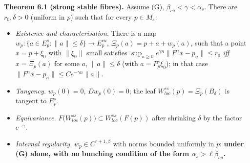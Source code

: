 \documentclass[11pt,a4paper]{article}
\theoremstyle{plain}
\theoremstyle{definition}
\theoremstyle{remark}
\numberwithin{equation}{section}
\numberwithin{figure}{section}
\begin{document}
\textbf{Theorem 6.1 (strong stable fibres).} Assume (G), $\beta_{cu}<\gamma<\alpha_s$. There are $r_0,\delta>0$ (uniform in $p$) such that for every $p\in M_\varepsilon$:
\begin{itemize}
    \item[(a)] \textit{Existence and characterisation.} There is a map $w_p:\{a\in E^s_p:\|a\|\le\delta\}\to E^{cu}_p$, $\Xi_p(a)=p+a+w_p(a)$, such that a point $x=p+\xi_0$ with $\|\xi_0\|$ small satisfies $\sup_{n\ge0}e^{\gamma n}\|F^nx-p_n\|\le r_0$ \textit{iff} $x=\Xi_p(a)$ for some $a$, $\|a\|\le\delta$ (with $a=P^s_p\xi_0$); in that case $\|F^nx-p_n\|\le Ce^{-\gamma n}\|a\|$.
    \item[(b)] \textit{Tangency.} $w_p(0)=0$, $Dw_p(0)=0$; the leaf $W^{ss}_{loc}(p)=\Xi_p(B_\delta)$ is tangent to $E^s_p$.
    \item[(c)] \textit{Equivariance.} $F\big(W^{ss}_{loc}(p)\big)\subset W^{ss}_{loc}(F(p))$ after shrinking $\delta$ by the factor $e^{-\gamma}$.
    \item[(d)] \textit{Internal regularity.} $w_p\in C^{r+1,\beta}$ with norms bounded uniformly in $p$: \textbf{under (G) alone, with no bunching condition of the form $\alpha_s>\ell\beta_{cu}$.}
\end{itemize}
\end{document}
